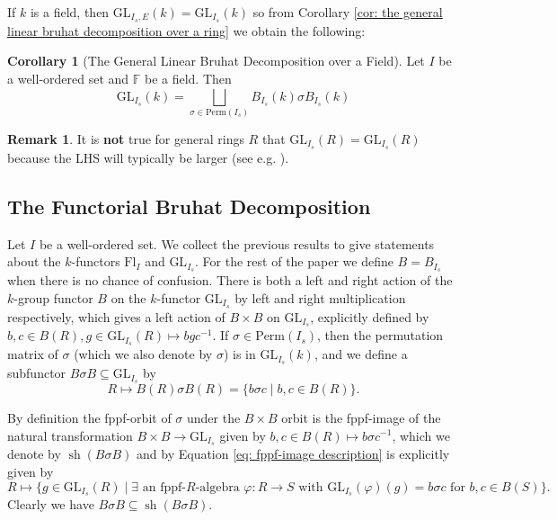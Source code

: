 \documentclass[oneside,11pt]{amsart}
\newcommand{\ff}{\ensuremath{\mathbb{F}}}
\newcommand{\GL}{\ensuremath{\text{GL}}}
\newcommand{\Fl}{\ensuremath{\text{Fl}}}
\newcommand{\Perm}{\ensuremath{\text{Perm}}}
\newcommand{\sh}{\operatorname{sh}}
\theoremstyle{definition}
\newtheorem{remark}{Remark}
\newtheorem{proof techniques}{Proof Techniques}
\newtheorem{corollary}{Corollary}
\begin{document}
If $k$ is a field, then $\GL_{I_s, E}(k) = \GL_{I_s}(k)$ so from Corollary \ref{cor: the general linear bruhat decomposition over a ring} we obtain the following: 

\begin{corollary}[The General Linear Bruhat Decomposition over a Field]\label{cor: the general linear bruhat decomposition over a field}
Let $I$ be a well-ordered set and $\ff$ be a field. Then 
\begin{equation*}
\GL_{I_s}(k) = \bigsqcup_{\sigma \in \Perm(I_s)} B_{I_s}(k) \sigma B_{I_s}(k)
\end{equation*}
\end{corollary}

\begin{remark}\label{rem: the general linear bruhat decomposition over a ring}
It is \textbf{not} true for general rings $R$ that $\GL_{I_s}(R) = \GL_{I_s}(R)$ because the LHS will typically be larger (see e.g. \cite{onn-prasad-vaserstein2006}). 
\end{remark}



\subsection{The Functorial Bruhat Decomposition}
 
Let $I$ be a well-ordered set. We collect the previous results to give statements about the $k$-functors $\Fl_I$ and $\GL_{I_s}$. For the rest of the paper we define $B = B_{I_s}$ when there is no chance of confusion. There is both a left and right action of the $k$-group functor $B$ on the $k$-functor $\GL_{I_s}$ by left and right multiplication respectively, which gives a left action of $B \times B$ on $\GL_{I_s}$, explicitly defined by $b , c \in B(R) , g \in \GL_{I_s}(R) \mapsto b g c^{-1}$. If $\sigma \in \Perm(I_s)$, then the permutation matrix of $\sigma$ (which we also denote by $\sigma$) is in $\GL_{I_s}(k)$, and we define a subfunctor $B \sigma B \subseteq \GL_{I_s}$ by 
\begin{equation*}
R \mapsto B(R) \sigma B(R) = \{ b \sigma c \mid b , c \in B(R) \}.
\end{equation*} 

By definition the fppf-orbit of $\sigma$ under the $B \times B$ orbit is the fppf-image of the natural transformation $B \times B \to \GL_{I_s}$ given by $b , c \in B(R) \mapsto b \sigma c^{-1}$, which we denote by $\sh(B \sigma B)$ and by Equation \ref{eq: fppf-image description} is explicitly given by
\begin{equation}\label{eq: sheafification of BsigmaB}
R \mapsto \{ g \in \GL_{I_s}(R) \mid \exists \text{ an fppf-$R$-algebra } \varphi : R \to S \text{ with } \GL_{I_s}(\varphi)(g) = b \sigma c \text{ for } b , c \in B(S) \}. 
\end{equation}
Clearly we have $B \sigma B \subseteq \sh(B \sigma B)$. 
\end{document}
